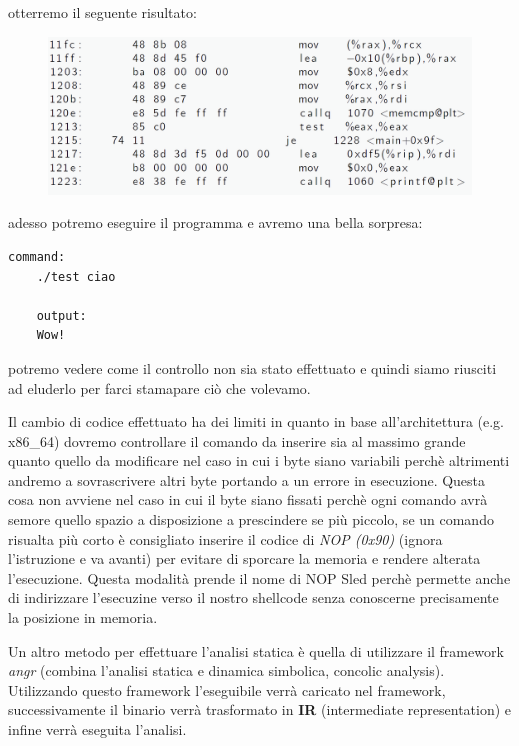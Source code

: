 otterremo il seguente risultato:
\begin{figure}[h!]
    \includegraphics[width=.6\linewidth]{res/static_modificatio_test2.png}
    \centering
    \caption{}
\end{figure}
adesso potremo eseguire il programma e avremo una bella sorpresa:
\begin{lstlisting}[language=bash]
    command:
    ./test ciao

    output:
    Wow!
\end{lstlisting}
potremo vedere come il controllo non sia stato effettuato e quindi siamo riusciti ad eluderlo per farci stamapare ciò che volevamo.

\begin{lema}
    Il cambio di codice effettuato ha dei limiti in quanto in base all'architettura (e.g. x86\_64) dovremo controllare il comando da inserire sia al massimo grande quanto quello da modificare nel caso in cui i byte siano variabili perchè altrimenti andremo a sovrascrivere altri byte portando a un errore in esecuzione.
    Questa cosa non avviene nel caso in cui il byte siano fissati perchè ogni comando avrà semore quello spazio a disposizione a prescindere se più piccolo, se un comando risualta più corto è consigliato inserire il codice di \textit{NOP (0x90)} (ignora l'istruzione e va avanti) per evitare di sporcare la memoria e rendere alterata l'esecuzione.
    Questa modalità prende il nome di NOP Sled perchè permette anche di indirizzare l'esecuzine verso il nostro shellcode senza conoscerne precisamente la posizione in memoria.
\end{lema}

Un altro metodo per effettuare l'analisi statica è quella di utilizzare il framework \textit{angr} (combina l'analisi statica e dinamica simbolica, concolic analysis).
Utilizzando questo framework l'eseguibile verrà caricato nel framework, successivamente il binario verrà trasformato in \textbf{IR} (intermediate representation) e infine verrà eseguita l'analisi.
